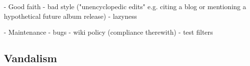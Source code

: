 - Good faith
  - bad style ("unencyclopedic edits" e.g. citing a blog or mentioning a hypothetical future album release)
  - lazyness


- Maintenance
  - bugs
  - wiki policy (compliance therewith)
  - test filters

\subsection{Vandalism}
\begin{comment}
# Filters targetting vandalism

The vast majority of edit filters on EN Wikipedia could be said to target (different forms of) vandalism.
Examples herefor are filters for *juvenile* types of vandalism (inserting swear or obscene words or nonsence sequences of characters into articles), for *hoaxing* or for *link spam*.
In principle, one can open quite a few subcategories here (also check https://en.wikipedia.org/wiki/Wikipedia:Vandalism for a "in-house" classification of vandalism types on Wikipedia).
Some vandalism types seem to be more severe than others (*sock puppetry* or persistant *long term* vandals).
For these, often times, the implemented filters are **private**.
This means, only edit filter editors can view the exact filter pattern or the comments of these.
Although this clashes with the overall *transparency* of the project (is there a guideline subscribing to this value? couldn't find a specific mention), the reasoning here is that otherwise, persistent vandals will be able to check for the pattern of the filter targetting their edits and just find a new way around it~\cite{Wikipedia:EditFilter}. %
There are also private filters targetting personal attack or abuse cases.
Here, filters are private in order to protect the affected person(s)~\cite{Wikipedia:EditFilter}.

The current state is also an "improvement" compared to the initially proposed visibility level of edit filters.
In the initial version of the EditFilters Page (https://en.wikipedia.org/w/index.php?title=Wikipedia:Edit_filter&oldid=221158142) Andrew Garrett (User:Werdna), the author of the AbuseFilter MediaWiki extension, was suggesting that all filters should be private and only a group of previously approved users should be able to view them.
    (This was met by the community with a strong resistence, especially since at the time one of the most discussed features was the ability of filters to (temporarily) block users. Editors involved in the discussion felt strongly that no fully automated agent should be able to block human editors.)


\end{comment}

